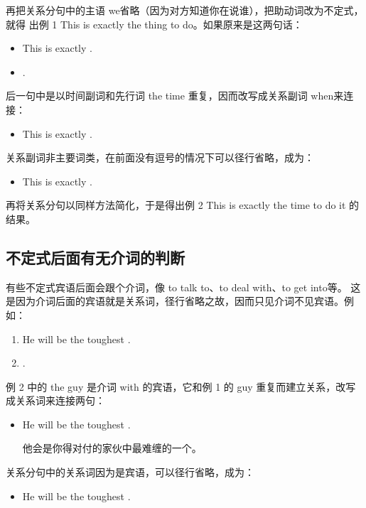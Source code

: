 再把关系分句中的主语 we省略（因为对方知道你在说谁），把助动词改为不定式，就得
出例 1 This is exactly the thing to do。如果原来是这两句话：
\begin{itemize}
\item This is exactly .
\item {}   .
\end{itemize}

后一句中是以时间副词和先行词 the time 重复，因而改写成关系副词 when来连接：
\begin{itemize}
\item This is exactly  .
\end{itemize}

关系副词非主要词类，在前面没有逗号的情况下可以径行省略，成为：
\begin{itemize}
\item This is exactly  .
\end{itemize}
再将关系分句以同样方法简化，于是得出例 2 This is exactly the time to do it 的
结果。

\subsection{不定式后面有无介词的判断}

有些不定式宾语后面会跟个介词，像 to talk to、to deal with、to get into等。
这是因为介词后面的宾语就是关系词，径行省略之故，因而只见介词不见宾语。例
如：
\begin{enumerate}
\item He will be the toughest .
\item {}   .
\end{enumerate}
例 2 中的 the guy 是介词 with 的宾语，它和例 1 的 guy
重复而建立关系，改写成关系词来连接两句：
\begin{itemize}
\item He will be the toughest  .

  他会是你得对付的家伙中最难缠的一个。
\end{itemize}

关系分句中的关系词因为是宾语，可以径行省略，成为：
\begin{itemize}
\item He will be the toughest  .
\end{itemize}

